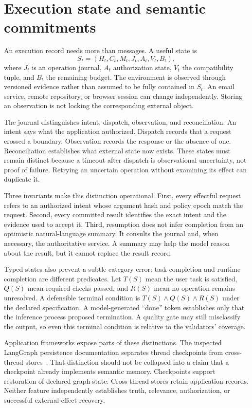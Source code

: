 \section{Execution state and semantic commitments}\label{sec:C20:state}
An execution record needs more than messages. A useful state is
\begin{equation}
 S_t=(H_t,C_t,M_t,J_t,A_t,V_t,B_t),
\end{equation}
where $J_t$ is an operation journal, $A_t$ authorization state, $V_t$ the compatibility tuple, and $B_t$ the remaining budget. The environment is observed through versioned evidence rather than assumed to be fully contained in $S_t$. An email service, remote repository, or browser session can change independently. Storing an observation is not locking the corresponding external object.

The journal distinguishes intent, dispatch, observation, and reconciliation. An intent says what the application authorized. Dispatch records that a request crossed a boundary. Observation records the response or the absence of one. Reconciliation establishes what external state now exists. These states must remain distinct because a timeout after dispatch is observational uncertainty, not proof of failure. Retrying an uncertain operation without examining its effect can duplicate it.

Three invariants make this distinction operational. First, every effectful request refers to an authorized intent whose argument hash and policy epoch match the request. Second, every committed result identifies the exact intent and the evidence used to accept it. Third, resumption does not infer completion from an optimistic natural-language summary. It consults the journal and, when necessary, the authoritative service. A summary may help the model reason about the result, but it cannot replace the result record.

Typed states also prevent a subtle category error: task completion and runtime completion are different predicates. Let $T(S)$ mean the user task is satisfied, $Q(S)$ mean required checks passed, and $R(S)$ mean no operation remains unresolved. A defensible terminal condition is $T(S)\land Q(S)\land R(S)$ under the declared specification. A model-generated ``done'' token establishes only that the inference process proposed termination. A quality gate may still misclassify the output, so even this terminal condition is relative to the validators' coverage.

Application frameworks expose parts of these distinctions. The inspected LangGraph persistence documentation separates thread checkpoints from cross-thread stores~\cite{langgraph2026docs}. That distinction should not be collapsed into a claim that a checkpoint already implements semantic memory. Checkpoints support restoration of declared graph state. Cross-thread stores retain application records. Neither feature independently establishes truth, relevance, authorization, or successful external-effect recovery.

